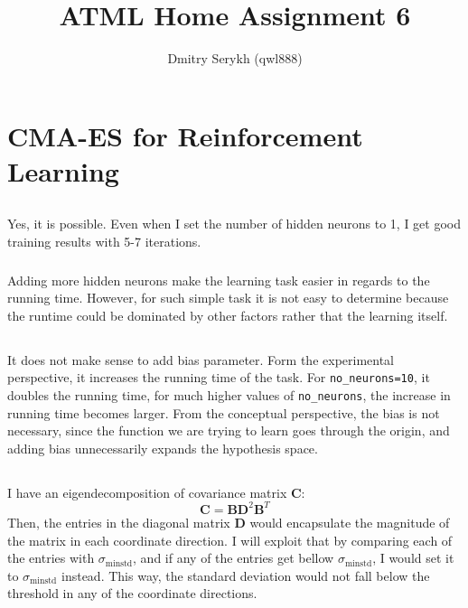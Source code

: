 \documentclass[a4paper]{article}
\title{\vspace{-5cm}ATML Home Assignment 6}
\author{Dmitry Serykh (qwl888)}
\newcommand*{\bs}[1]{\boldsymbol{#1}}
\begin{document}
\maketitle
\section{CMA-ES for Reinforcement Learning}
\label{sec:1}
\subsection{}
\label{subsec:11}
\subsubsection{}
Yes, it is possible. Even when I set the number of hidden neurons to 1, I get
good training results with 5-7 iterations.

\subsubsection{}
Adding more hidden neurons make the learning task easier in regards to the
running time. However, for such simple task it is not easy to determine because
the runtime could be dominated by other factors rather that the learning itself.

\subsection{}
\label{subsec:12}
It does not make sense to add bias parameter. Form the experimental perspective,
it increases the running time of the task. For \texttt{no\_neurons=10}, it
doubles the running time, for much higher values of \texttt{no\_neurons}, the
increase in running time becomes larger. From the conceptual perspective, the bias is
not necessary, since the function we are trying to learn goes through the
origin, and adding bias unnecessarily expands the hypothesis space.

\subsection{}
\label{subsec:13}
I have an eigendecomposition of covariance matrix $\bs{C}$:
\[
\bs{C} = \bs{B}\bs{D}^2\bs{B}^T
\]
Then, the entries in the diagonal matrix $\bs{D}$ would encapsulate the
magnitude of the matrix in each coordinate direction. I will exploit that by comparing
each of the entries with $\sigma_{\operatorname{minstd}}$, and if any of the
entries get bellow $\sigma_{\operatorname{minstd}}$, I would set it to
$\sigma_{\operatorname{minstd}}$ instead. This way, the standard deviation would not fall
below the threshold in any of the coordinate directions.
\end{document}
